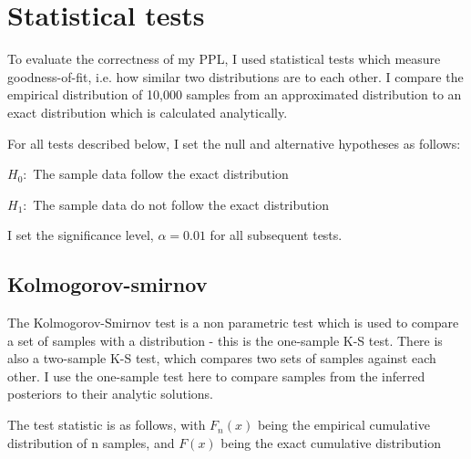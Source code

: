 





\section{Statistical tests}
To evaluate the correctness of my PPL, I used statistical tests which measure goodness-of-fit, i.e. how similar two distributions are to each other. I compare the empirical distribution of 10,000 samples from an approximated distribution to an exact distribution which is calculated analytically. 

For all tests described below, I set the null and alternative hypotheses as follows:

$H_0:$ The sample data follow the exact distribution

$H_1:$ The sample data do not follow the exact distribution

I set the significance level, $\alpha = 0.01$ for all subsequent tests.

\subsection{Kolmogorov-smirnov}

The Kolmogorov-Smirnov test is a non parametric test which is used to compare a set of samples with a distribution - this is the one-sample K-S test. There is also a two-sample K-S test, which compares two sets of samples against each other. I use the one-sample test here to compare samples from the inferred posteriors to their analytic solutions.

The test statistic is as follows, with $F_n(x)$ being the empirical cumulative distribution of n samples, and $F(x)$ being the exact cumulative distribution

